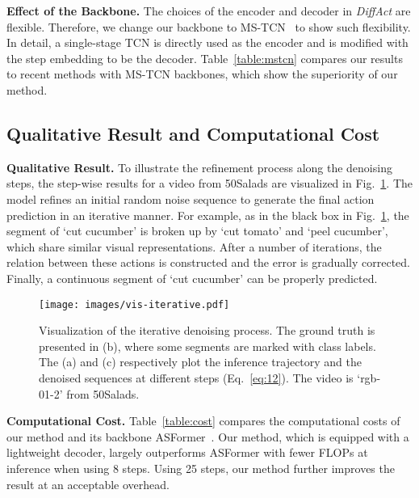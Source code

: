\documentclass[10pt,twocolumn,letterpaper]{article}
\begin{document}
\textbf{Effect of the Backbone.}
The choices of the encoder and decoder in \textit{DiffAct} are flexible. 
Therefore, we change our backbone to MS-TCN~\cite{2019_CVPR_Farha} to show such flexibility.
In detail, a single-stage TCN is directly used as the encoder and is modified with the step embedding to be the decoder.
Table~\ref{table:mstcn} compares our results to recent methods with MS-TCN backbones, which show the superiority of our method.




\subsection{Qualitative Result and Computational Cost}

\textbf{Qualitative Result.} 
To illustrate the refinement process along the denoising steps, the step-wise results for a video from 50Salads are visualized in Fig.~\ref{fig:vis-iterative}.
The model refines an initial random noise sequence to generate the final action prediction in an iterative manner. For example, as in the black box in Fig.~\ref{fig:vis-iterative}, the segment of `cut cucumber' is broken up by `cut tomato' and `peel cucumber', which share similar visual representations. After a number of iterations, the relation between these actions is constructed and the error is gradually corrected. Finally, a continuous segment of `cut cucumber' can be properly predicted.


\begin{figure}[t]
\begin{center}
   \texttt{[image: images/vis-iterative.pdf]}
\end{center}
    \caption{Visualization of the iterative denoising process. The ground truth is presented in (b), where some segments are marked with class labels. The (a) and (c) respectively plot the inference trajectory  and the denoised sequences  at different steps (Eq.~\ref{eq:12}). The video is `rgb-01-2' from 50Salads.}
\label{fig:vis-iterative}
\end{figure}



\textbf{Computational Cost.} 
Table~\ref{table:cost} compares the computational costs of our method and its backbone ASFormer~\cite{2021_BMVC_Yi}.
Our method, which is equipped with a lightweight decoder, largely outperforms ASFormer with fewer FLOPs at inference when using 8 steps.
Using 25 steps, our method further improves the result at an acceptable overhead.
\end{document}

